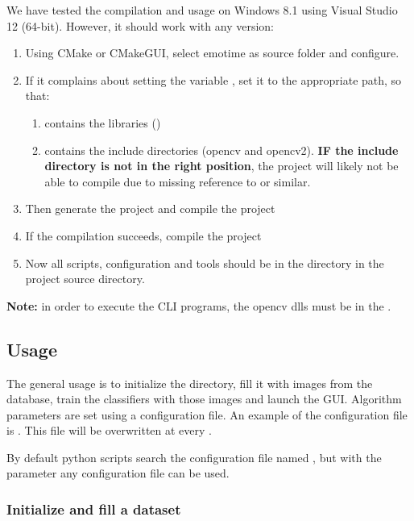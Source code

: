 We have tested the compilation and usage on Windows 8.1 using Visual Studio 12
(64-bit). However, it should work with any version:

\begin{enumerate}
  \item Using CMake or CMakeGUI, select emotime as source folder and configure.
  \item If it complains about setting the variable , set it to the appropriate path, so that:
    \begin{enumerate}
      \item {} contains the libraries ()
      \item {} contains the include
        directories (opencv and opencv2). \textbf{IF the include directory is
        not in the right position}, the project will likely not be able to
        compile due to missing reference to  or similar.
    \end{enumerate}
  \item Then generate the project and compile the project 
  \item If the compilation succeeds, compile the project 
  \item Now all scripts, configuration and tools should be in the directory
     in the project source directory.
\end{enumerate}

\textbf{Note:} in order to execute the CLI programs, the opencv dlls must be in
the .

\subsection{Usage}

The general usage is to initialize the  directory, fill it with
images from the  database, train the classifiers with those images and
launch the GUI\@. Algorithm parameters are set using a configuration file. An
example of the configuration file is . This file
will be overwritten at every .

By default python scripts search the configuration file named
, but with the parameter  any
configuration file can be used.

\subsubsection*{Initialize and fill a dataset}

